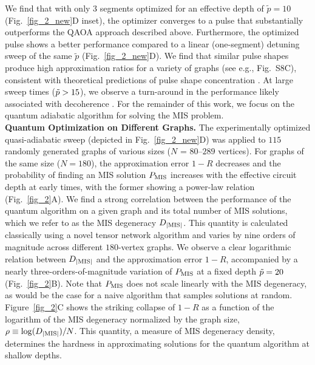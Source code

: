 \documentclass[twocolumn,amssymb,secnumarabic, prl, aps, nofootinbib]{revtex4-1}
\newcommand{\PMIS}{P_\textnormal{MIS}}
\newcommand{\DMIS}{D_{|\textnormal{MIS}|}}
\begin{document}
We find that with only $3$ segments optimized for an effective depth of $\tilde{p} = 10$ (Fig.~\ref{fig_2_new}D inset), the optimizer converges to a pulse  that substantially outperforms the QAOA approach described above. Furthermore, the optimized pulse shows a better performance compared to a linear (one-segment) detuning sweep of the same $\tilde{p}$ (Fig.~\ref{fig_2_new}D). We find that similar pulse shapes produce high approximation ratios for a variety of graphs (see e.g., Fig.~S8C), consistent with theoretical predictions of pulse shape concentration \cite{brandao_2018, zhou_quantum_2020, chou_overlap_gap_2021, SI}. At large sweep times ($\Tilde{p}>15$), we observe a turn-around in the performance likely associated with decoherence \cite{SI}. For the remainder of this work, we focus on the quantum adiabatic algorithm for solving the MIS problem.\\


\noindent \textbf
{Quantum Optimization on Different Graphs.}
The experimentally optimized quasi-adiabatic sweep (depicted in Fig.~\ref{fig_2_new}D) was applied to $115$ randomly generated graphs of various sizes ($N$ = $80$--$289$ vertices). For graphs of the same size ($N = 180$), the approximation error $1-R$ decreases and the probability of finding an MIS solution $\PMIS$ increases with the effective circuit depth at early times, with the former showing a power-law relation (Fig.~\ref{fig_2}A).
We find a strong correlation between the performance of the quantum algorithm on a given graph and its total number of MIS solutions, which we refer to as the MIS degeneracy $\DMIS$. This quantity is calculated classically using a novel tensor network algorithm \cite{SI, liu_tensor_2021} and varies by nine orders of magnitude across different $180$-vertex graphs. We observe a clear logarithmic relation between $\DMIS$ and the approximation error $1-R$, accompanied by a nearly three-orders-of-magnitude variation of $\PMIS$ at a fixed depth ${\Tilde p}= 20$  (Fig.~\ref{fig_2}B). Note that $\PMIS$ does not scale linearly with the MIS degeneracy, as would be the case for a naive algorithm that samples solutions at random. Figure~\ref{fig_2}C shows the striking collapse of $1-R$ as a function of the logarithm of the MIS degeneracy normalized by the graph size, $\rho \equiv \log(\DMIS)/N$. This quantity, a measure of MIS degeneracy density, determines the hardness in approximating solutions for the quantum algorithm at shallow depths.
\end{document}
